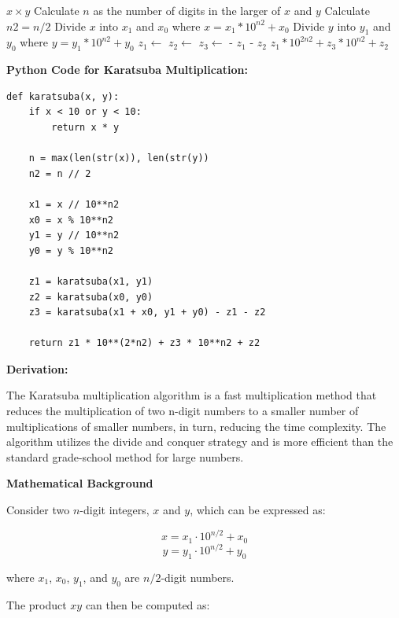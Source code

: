 \documentclass[12pt]{book} %
\begin{document}
\begin{algorithm}
\caption{Karatsuba Multiplication}
\begin{algorithmic}
        \State \Return $x \times y$
    \EndIf
    \State Calculate $n$ as the number of digits in the larger of $x$ and $y$
    \State Calculate $n2 = n / 2$
    \State Divide $x$ into $x_1$ and $x_0$ where $x = x_1*10^{n2} + x_0$
    \State Divide $y$ into $y_1$ and $y_0$ where $y = y_1*10^{n2} + y_0$
    \State $z_1 \gets$ 
    \State $z_2 \gets$ 
    \State $z_3 \gets$  - $z_1$ - $z_2$
    \State \Return $z_1*10^{2n2} + z_3*10^{n2} + z_2$
\EndFunction
\end{algorithmic}
\end{algorithm}
\FloatBarrier
\textbf{Python Code for Karatsuba Multiplication:}
\FloatBarrier
\begin{lstlisting}
def karatsuba(x, y):
    if x < 10 or y < 10:
        return x * y
    
    n = max(len(str(x)), len(str(y))
    n2 = n // 2
    
    x1 = x // 10**n2
    x0 = x % 10**n2
    y1 = y // 10**n2
    y0 = y % 10**n2

    z1 = karatsuba(x1, y1)
    z2 = karatsuba(x0, y0)
    z3 = karatsuba(x1 + x0, y1 + y0) - z1 - z2

    return z1 * 10**(2*n2) + z3 * 10**n2 + z2
\end{lstlisting}

\textbf{Derivation:}

The Karatsuba multiplication algorithm is a fast multiplication method that reduces the multiplication of two n-digit numbers to a smaller number of multiplications of smaller numbers, in turn, reducing the time complexity. The algorithm utilizes the divide and conquer strategy and is more efficient than the standard grade-school method for large numbers.

\textbf{Mathematical Background}

Consider two \(n\)-digit integers, \(x\) and \(y\), which can be expressed as:

\[ x = x_1 \cdot 10^{n/2} + x_0 \]
\[ y = y_1 \cdot 10^{n/2} + y_0 \]

where \(x_1\), \(x_0\), \(y_1\), and \(y_0\) are \(n/2\)-digit numbers.

The product \(xy\) can then be computed as:
\end{document}
